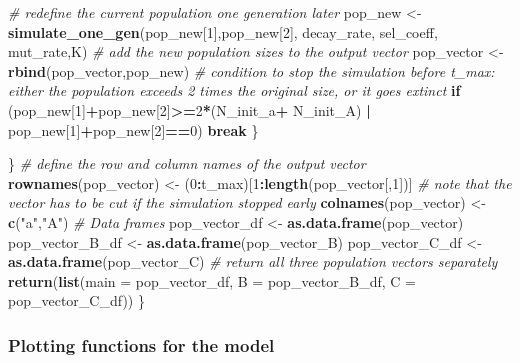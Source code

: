 \documentclass[
]{article}
\newenvironment{Shaded}{\begin{snugshade}}{\end{snugshade}}
\newcommand{\AttributeTok}[1]{\textcolor[rgb]{0.13,0.29,0.53}{#1}}
\newcommand{\CommentTok}[1]{\textcolor[rgb]{0.56,0.35,0.01}{\textit{#1}}}
\newcommand{\ControlFlowTok}[1]{\textcolor[rgb]{0.13,0.29,0.53}{\textbf{#1}}}
\newcommand{\DecValTok}[1]{\textcolor[rgb]{0.00,0.00,0.81}{#1}}
\newcommand{\FunctionTok}[1]{\textcolor[rgb]{0.13,0.29,0.53}{\textbf{#1}}}
\newcommand{\NormalTok}[1]{#1}
\newcommand{\OtherTok}[1]{\textcolor[rgb]{0.56,0.35,0.01}{#1}}
\newcommand{\SpecialCharTok}[1]{\textcolor[rgb]{0.81,0.36,0.00}{\textbf{#1}}}
\newcommand{\StringTok}[1]{\textcolor[rgb]{0.31,0.60,0.02}{#1}}
\begin{document}
\begin{Shaded}
\begin{Highlighting}[]
      \CommentTok{\# redefine the current population one generation later}
\NormalTok{      pop\_new }\OtherTok{\textless{}{-}} \FunctionTok{simulate\_one\_gen}\NormalTok{(pop\_new[}\DecValTok{1}\NormalTok{],pop\_new[}\DecValTok{2}\NormalTok{], decay\_rate, sel\_coeff, mut\_rate,K)}
      \CommentTok{\# add the new population sizes to the output vector}
\NormalTok{      pop\_vector }\OtherTok{\textless{}{-}} \FunctionTok{rbind}\NormalTok{(pop\_vector,pop\_new)}
      \CommentTok{\# condition to stop the simulation before t\_max: either the population exceeds 2 times the original size, or it goes extinct}
      \ControlFlowTok{if}\NormalTok{ (pop\_new[}\DecValTok{1}\NormalTok{]}\SpecialCharTok{+}\NormalTok{pop\_new[}\DecValTok{2}\NormalTok{]}\SpecialCharTok{\textgreater{}=}\DecValTok{2}\SpecialCharTok{*}\NormalTok{(N\_init\_a}\SpecialCharTok{+}\NormalTok{ N\_init\_A) }\SpecialCharTok{|}\NormalTok{ pop\_new[}\DecValTok{1}\NormalTok{]}\SpecialCharTok{+}\NormalTok{pop\_new[}\DecValTok{2}\NormalTok{]}\SpecialCharTok{==}\DecValTok{0}\NormalTok{) }\ControlFlowTok{break}
\NormalTok{    \}}
    
\NormalTok{  \}}
  \CommentTok{\# define the row and column names of the output vector}
  \FunctionTok{rownames}\NormalTok{(pop\_vector) }\OtherTok{\textless{}{-}}\NormalTok{ (}\DecValTok{0}\SpecialCharTok{:}\NormalTok{t\_max)[}\DecValTok{1}\SpecialCharTok{:}\FunctionTok{length}\NormalTok{(pop\_vector[,}\DecValTok{1}\NormalTok{])] }\CommentTok{\# note that the vector has to be cut if the simulation stopped early}
  \FunctionTok{colnames}\NormalTok{(pop\_vector) }\OtherTok{\textless{}{-}} \FunctionTok{c}\NormalTok{(}\StringTok{"a"}\NormalTok{,}\StringTok{"A"}\NormalTok{)}
  \CommentTok{\# Data frames}
\NormalTok{  pop\_vector\_df }\OtherTok{\textless{}{-}} \FunctionTok{as.data.frame}\NormalTok{(pop\_vector)}
\NormalTok{  pop\_vector\_B\_df }\OtherTok{\textless{}{-}} \FunctionTok{as.data.frame}\NormalTok{(pop\_vector\_B)}
\NormalTok{  pop\_vector\_C\_df }\OtherTok{\textless{}{-}} \FunctionTok{as.data.frame}\NormalTok{(pop\_vector\_C)}
  \CommentTok{\# return all three population vectors separately}
  \FunctionTok{return}\NormalTok{(}\FunctionTok{list}\NormalTok{(}\AttributeTok{main =}\NormalTok{ pop\_vector\_df, }\AttributeTok{B =}\NormalTok{ pop\_vector\_B\_df, }\AttributeTok{C =}\NormalTok{ pop\_vector\_C\_df))}
\NormalTok{\}}
\end{Highlighting}
\end{Shaded}

\subsubsection{Plotting functions for the
model}\label{plotting-functions-for-the-model}
\end{document}
